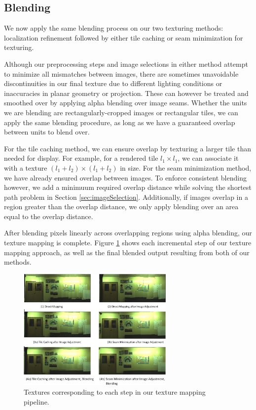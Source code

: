 \documentclass[10pt,twocolumn,letterpaper]{article}
\begin{document}
\subsection{Blending}
\label{sec:blending}
We now apply the same blending process on our two texturing methods:
localization refinement followed by either tile caching or seam
minimization for texturing.

Although our preprocessing steps and image selections in either method
attempt to minimize all mismatches between images, there are sometimes
unavoidable discontinuities in our final texture due to different
lighting conditions or inaccuracies in planar geometry or
projection. These can however be treated and smoothed over by applying
alpha blending over image seams.  Whether the units we are blending
are rectangularly-cropped images or rectangular tiles, we can apply
the same blending procedure, as long as we have a guaranteed overlap
between units to blend over.

For the tile caching method, we can ensure overlap by texturing a
larger tile than needed for display. For example, for a rendered tile
$l_1 \times l_1$, we can associate it with a texture $(l_1 + l_2)
\times (l_1 + l_2)$ in size. For the seam minimization method, we have
already ensured overlap between images. To enforce consistent blending
however, we add a minimuum required overlap distance while solving the
shortest path problem in Section
\ref{sec:imageSelection}. Additionally, if images overlap in a region
greater than the overlap distance, we only apply blending over an area
equal to the overlap distance.

After blending pixels linearly across overlapping regions using alpha
blending, our texture mapping is complete. Figure
\ref{fig:pipelineimages} shows each incremental step of our texture
mapping approach, as well as the final blended output resulting from
both of our methods.

\begin{figure}
  \centering
  \includegraphics[width=3in]{pipelineimages.pdf}
  \caption{Textures corresponding to each step in our texture mapping
    pipeline.}
  \label{fig:pipelineimages}
\end{figure}
\end{document}
